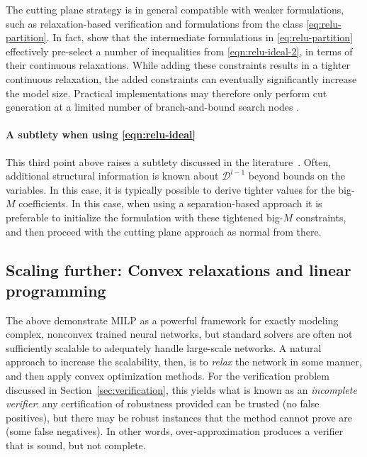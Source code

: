 The cutting plane strategy is in general compatible with weaker formulations, such as relaxation-based verification \citep{zhang2022general} and  formulations from the class \eqref{eq:relu-partition}. 
In fact, \cite{tsay2021partition} show that the intermediate formulations in \eqref{eq:relu-partition} effectively pre-select a number of inequalities from \eqref{eqn:relu-ideal-2}, in terms of their continuous relaxations. 
While adding these constraints results in a tighter continuous relaxation, the added constraints can eventually significantly increase the model size. Practical implementations may therefore only perform cut generation at a limited number of branch-and-bound search nodes \citep{depalma2021scaling,tsay2021partition}. 

\paragraph{A subtlety when using \eqref{eqn:relu-ideal}}
This third point above raises a subtlety discussed in the literature~\citep[Appendix F]{depalma2021scaling}. Often, additional structural information is known about $\mathcal{D}^{l-1}$ beyond bounds on the variables. In this case, it is typically possible to derive tighter values for the big-$M$ coefficients. In this case, when using a separation-based approach it is preferable to initialize the formulation with these tightened big-$M$ constraints, and then proceed with the cutting plane approach as normal from there.

\subsection{Scaling further: Convex relaxations and linear programming}
\label{sec:relaxations}

The above demonstrate MILP as a powerful framework for exactly modeling complex, nonconvex trained neural networks, but standard solvers are often not sufficiently scalable to adequately handle large-scale networks. A natural approach to increase the scalability, then, is to \emph{relax} the network in some manner, and then apply convex optimization methods. For the verification problem discussed in Section~\ref{sec:verification}, this yields what is known as an \emph{incomplete verifier}: any certification of robustness provided can be trusted (no false positives), but there may be robust instances that the method cannot prove are (some false negatives). 
In other words, over-approximation produces a verifier that is sound, but not complete. 

